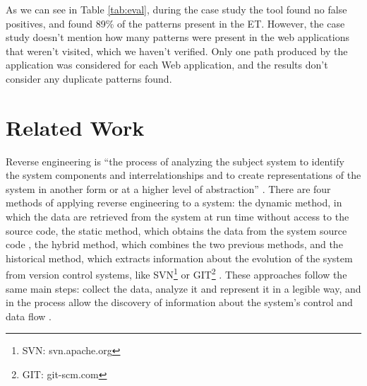 \documentclass[conference]{IEEEtran}
\begin{document}
\begin{table}[!htb]
\caption{Evaluation set results.}
\label{tab:eval}
\end{table}

As we can see in Table \ref{tab:eval}, during the case study the tool found no false positives, and found 89\% of the  patterns present in the ET. However, the case study doesn't mention how many patterns were present in the web applications that weren't visited, which we haven't verified. Only one path produced by the application was considered for each Web application, and the results don't consider any duplicate patterns found.

\section{Related Work}\label{sec:sota}

Reverse engineering is ``the process of analyzing the subject system to identify the system components and interrelationships and to create representations of the system in another form or at a higher level of abstraction'' \cite{chikofsky1990reverse}. There are four methods of applying reverse engineering to a system: the dynamic method, in which the data are retrieved from the system at run time without access to the source code, the static method, which obtains the data from the system source code \cite{systa1999dynamic}, the hybrid method, which combines the two previous methods, and the historical method, which extracts information about the evolution of the system
from version control systems, like SVN\footnote{SVN: svn.apache.org} or GIT\footnote{GIT: git-scm.com} \cite{canfora2011achievements}. These approaches follow the same main steps: collect the data, analyze it and represent it in a legible way, and in the process allow the discovery of information about the system's control and data flow \cite{pacione2003comparative}.
\end{document}
